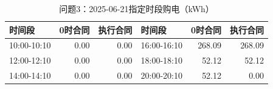 \begin{table}[H]\centering\small\caption{问题3：2025-06-21指定时段购电（kWh）}\label{tab:q320250621p}
\begin{tabular}{lrrlrr}\toprule
时间段 & 0时合同 & 执行合同 & 时间段 & 0时合同 & 执行合同\\\midrule
10:00-10:10 & 0.00 & 0.00 & 16:00-16:10 & 268.09 & 268.09\\
12:00-12:10 & 0.00 & 0.00 & 18:00-18:10 & 52.12 & 52.12\\
14:00-14:10 & 0.00 & 0.00 & 20:00-20:10 & 52.12 & 0.00\\
\bottomrule\end{tabular}\end{table}
